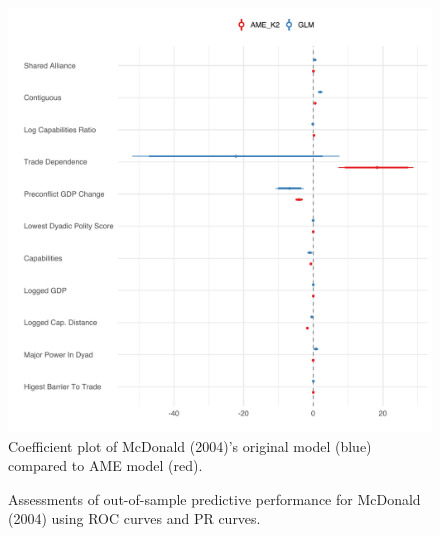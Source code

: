 \documentclass[12pt]{amsart}
\begin{document}
\begin{figure}
\includegraphics[width=\textwidth]{McDonald_coefs.pdf}
\caption{\label{fig:mcdCoefs}Coefficient plot of McDonald (2004)'s original model (blue) compared to AME model (red).}
\end{figure}

\begin{figure}
\centering   
{}
\caption{\label{fig:mcdall} Assessments of out-of-sample predictive performance for McDonald (2004) using ROC curves and PR curves.}
\end{figure}
\end{document}
